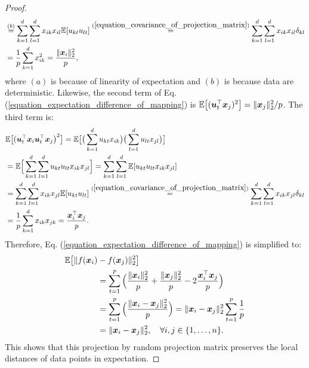 \documentclass{article}
\def\b{\ensuremath\boldsymbol}
\begin{document}
\begin{proof}
\begin{align*}
&\overset{(b)}{=} \sum_{k=1}^d \sum_{l=1}^d x_{ik} x_{il} \mathbb{E}[u_{kt} u_{lt}] \overset{(\ref{equation_covariance_of_projection_matrix})}{=} \sum_{k=1}^d \sum_{l=1}^d x_{ik} x_{il} \delta_{kl} \\
&= \frac{1}{p} \sum_{k=1}^d x_{ik}^2 = \frac{\|\b{x}_i\|_2^2}{p},
\end{align*}
where $(a)$ is because of linearity of expectation and $(b)$ is because data are deterministic.
Likewise, the second term of Eq. (\ref{equation_expectation_difference_of_mapping}) is $\mathbb{E}\big[(\b{u}_t^\top \b{x}_j)^2\big] = \|\b{x}_j\|_2^2 / p$. 
The third term is:
\begin{align*}
&\mathbb{E}\big[(\b{u}_t^\top \b{x}_i \b{u}_t^\top \b{x}_j\big)^2\big] = \mathbb{E}\big[\big(\sum_{k=1}^d u_{kt} x_{ik}\big) \big(\sum_{l=1}^d u_{lt} x_{jl}\big)\big] \\
&= \mathbb{E}\Big[\sum_{k=1}^d \sum_{l=1}^d u_{kt} u_{lt} x_{ik} x_{jl}\Big] = \sum_{k=1}^d \sum_{l=1}^d \mathbb{E}[u_{kt} u_{lt} x_{ik} x_{jl}] \\
&= \sum_{k=1}^d \sum_{l=1}^d x_{ik} x_{jl} \mathbb{E}[u_{kt} u_{lt}] \overset{(\ref{equation_covariance_of_projection_matrix})}{=} \sum_{k=1}^d \sum_{l=1}^d x_{ik} x_{jl} \delta_{kl} \\
&= \frac{1}{p} \sum_{k=1}^d x_{ik} x_{jk} = \frac{\b{x}_i^\top \b{x}_j}{p}.
\end{align*}
Therefore, Eq. (\ref{equation_expectation_difference_of_mapping}) is simplified to:
\begin{align}
\mathbb{E}\big[\|f(\b{x}_i) &- f(\b{x}_j)\|_2^2\big] \nonumber\\
&= \sum_{t=1}^p \Big( \frac{\|\b{x}_i\|_2^2}{p} + \frac{\|\b{x}_j\|_2^2}{p} - 2\frac{\b{x}_i^\top \b{x}_j}{p} \Big) \nonumber\\
&= \sum_{t=1}^p \Big( \frac{\|\b{x}_i - \b{x}_j\|_2^2}{p} \Big) = \|\b{x}_i - \b{x}_j\|_2^2 \sum_{t=1}^p \frac{1}{p} \nonumber\\
&= \|\b{x}_i - \b{x}_j\|_2^2, \quad \forall i, j \in \{1, \dots, n\}.
\end{align}
This shows that this projection by random projection matrix preserves the local distances of data points in expectation. 


\end{proof}
\end{document}
